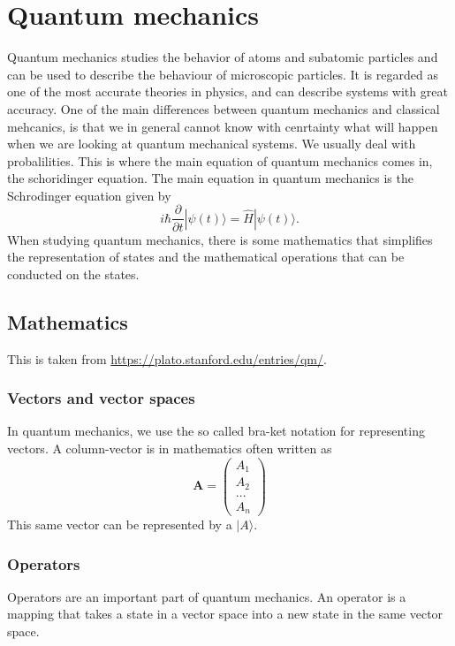 \section{Quantum mechanics}
Quantum mechanics studies the behavior of atoms and subatomic particles and can be used to describe the behaviour of microscopic particles. It is regarded as one of the most accurate theories in physics, and can describe systems with great accuracy. One of the main differences between quantum mechanics and classical mehcanics, is that we in general cannot know with cenrtainty what will happen when we are looking at quantum mechanical systems. We usually deal with probalilities. This is where the main equation of quantum mechanics comes in, the schoridinger equation. 
The main equation in quantum mechanics is the Schrodinger equation given by
\begin{equation}
    i\hbar \frac{\partial}{\partial t}|\psi (t)\rangle = \hat{H}|\psi(t)\rangle.
\end{equation}
When studying quantum mechanics, there is some mathematics that simplifies the representation of states and the mathematical operations that can be conducted on the states. 
\subsection{Mathematics}
This is taken from \url{https://plato.stanford.edu/entries/qm/}.
\subsubsection{Vectors and vector spaces}
In quantum mechanics, we use the so called bra-ket notation for representing vectors. A column-vector is in mathematics often written as
\begin{equation}
    \boldsymbol{A} = 
    \begin{pmatrix}
    A_1 \\
    A_2 \\
    ... \\
    A_n
    \end{pmatrix}
\end{equation}
This same vector can be represented by a $|A\rangle$. 

\subsubsection{Operators}
Operators are an important part of quantum mechanics. 
An operator is a mapping that takes a state in a vector space into a new state in the same vector space. 

